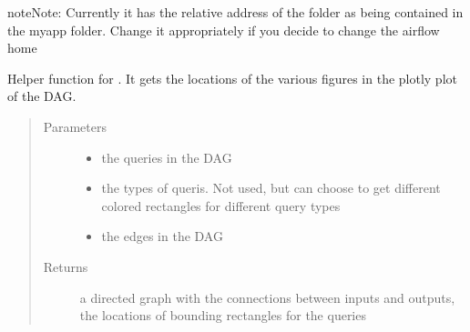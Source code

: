 \documentclass[letterpaper,10pt,english]{sphinxmanual}
\begin{document}
\begin{fulllineitems}
\begin{fulllineitems}
\begin{quote}
\begin{description}
\end{description}\end{quote}

\begin{sphinxadmonition}{note}{Note:}
Currently it has the relative address of the folder as being contained in the myapp folder. Change it appropriately if you decide to
change the airflow home
\end{sphinxadmonition}

\end{fulllineitems}


\begin{fulllineitems}
\label{\detokenize{dag:create_dag.DAG.get_drawable_dag}}
Helper function for {\hyperref[\detokenize{dag:create_dag.DAG.plot_dag}]{}}. It gets the locations of the various figures
in the plotly plot of the DAG.
\begin{quote}\begin{description}
\item[{Parameters}] \leavevmode\begin{itemize}
\item {} 
 \textendash{} the queries in the DAG

\item {} 
 \textendash{} the types of queris. Not used, but can choose to get different colored rectangles for different query types

\item {} 
 \textendash{} the edges in the DAG

\end{itemize}

\item[{Returns}] \leavevmode
a directed graph with the connections between inputs and outputs, the locations of bounding rectangles for the queries

\end{description}\end{quote}

\end{fulllineitems}



\end{fulllineitems}
\end{document}
